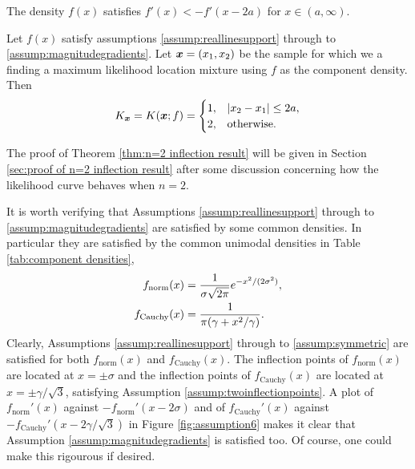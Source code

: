 		\begin{assumption}
			The density $f(x)$ satisfies $f'(x) < -f'(x - 2a)$ for $x \in (a,\infty)$.
			\label{assump:magnitudegradients}
		\end{assumption}

		\begin{theorem}
			\label{thm:n=2 inflection result}
			Let $f(x)$ satisfy assumptions \ref{assump:reallinesupport} through to \ref{assump:magnitudegradients}. Let ${\bm{{x}}} = (x_1,x_2)$ be the sample for which we a finding a maximum likelihood location mixture using $f$ as the component density. Then 
			\begin{equation}
				K_{\bm{{x}}} = K({\bm{{x}}};f) = 
					\begin{cases}
						1, &|x_2 - x_1| \leq 2a,\\
						2, &\text{otherwise.}
					\end{cases}
			\end{equation}
		\end{theorem}

		The proof of Theorem \ref{thm:n=2 inflection result} will be given in Section \ref{sec:proof of n=2 inflection result} after some discussion concerning how the likelihood curve behaves when $n = 2$.

		
		It is worth verifying that Assumptions \ref{assump:reallinesupport} through to \ref{assump:magnitudegradients} are satisfied by some common densities. In particular they are satisfied by the common unimodal densities in Table \ref{tab:component densities},
		\begin{align}
			f_\mathrm{norm}(x) &= \frac{1}{\sigma\sqrt{2\pi}} e^{-x^2/(2\sigma^2)},\\
			f_\mathrm{Cauchy}(x) &= \frac{1}{\pi (\gamma + x^2/\gamma)}.
		\end{align}
		Clearly, Assumptions \ref{assump:reallinesupport} through to \ref{assump:symmetric} are satisfied for both $f_\mathrm{norm}(x)$ and $f_\mathrm{Cauchy}(x)$.
		The inflection points of $f_\mathrm{norm}(x)$ are located at $x = \pm \sigma$ and the inflection points of $f_\mathrm{Cauchy}(x)$ are located at $x = \pm \gamma/\sqrt{3}$, satisfying Assumption \ref{assump:twoinflectionpoints}. A plot of $f_\mathrm{norm}'(x)$ against $-f_\mathrm{norm}'(x - 2\sigma)$ and of $f_\mathrm{Cauchy}'(x)$ against $-f_\mathrm{Cauchy}'(x - 2\gamma/\sqrt{3})$ in Figure \ref{fig:assumption6} makes it clear that Assumption \ref{assump:magnitudegradients} is satisfied too. Of course, one could make this rigourous if desired.

